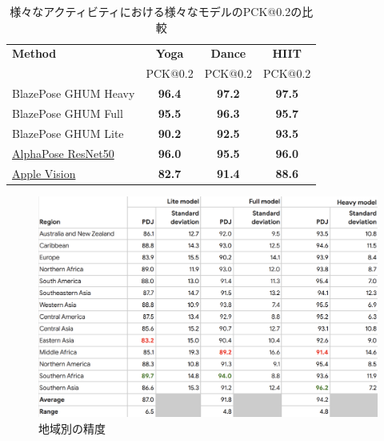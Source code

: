 \begin{table}[ht]
  \centering
  \begin{tabular}{|l|c|c|c|}
  \hline
  \textbf{Method} & \textbf{Yoga} & \textbf{Dance} & \textbf{HIIT} \\
                  & PCK@0.2       & PCK@0.2        & PCK@0.2       \\ 
  \hline
  BlazePose GHUM Heavy                                                      & \textbf{96.4} & \textbf{97.2} & \textbf{97.5} \\
  BlazePose GHUM Full                                                       & \textbf{95.5} & \textbf{96.3} & \textbf{95.7} \\
  BlazePose GHUM Lite                                                       & \textbf{90.2} & \textbf{92.5} & \textbf{93.5} \\
  \href{https://github.com/MVIG-SJTU/AlphaPose}{AlphaPose ResNet50}         & \textbf{96.0} & \textbf{95.5} & \textbf{96.0} \\
  \href{https://developer.apple.com/documentation/vision/detecting_human_body_poses_in_images}{Apple Vision} & \textbf{82.7} & \textbf{91.4} & \textbf{88.6} \\
  \hline
  \end{tabular}
  \caption{様々なアクティビティにおける様々なモデルのPCK@0.2の比較 \cite{pose-estimation-quality}}
  \label{tab:pose-estimation-quality}
  \end{table}
  
  \begin{figure}[H]
    \begin{center}
    \includegraphics[width=12cm]{figures/Model_Accuracy_by_Race.png}
    \caption{地域別の精度 \cite{Model-Accuracy-by-Race}}
    \label{fig:Model-Accuracy-by-Race}
    \end{center}
    \end{figure}

